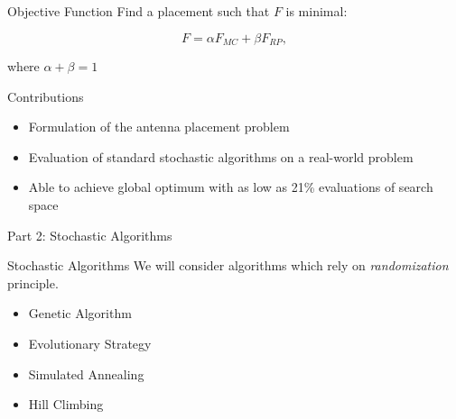 \documentclass{beamer}
\begin{document}
\begin{frame}{Objective Function}
    Find a placement such that $F$ is minimal:
    \begin{tcolorbox}[colback=green!5]
        \begin{equation} \label{eq:optimal}
            F = \alpha F_{MC} + \beta F_{RP},
        \end{equation}
    \end{tcolorbox}
    where $\alpha + \beta = 1$
\end{frame}



\begin{frame}[t]{Contributions}
    \begin{itemize}
        \item Formulation of the antenna placement problem
        \item Evaluation of standard stochastic algorithms on a real-world problem
        \item Able to achieve global optimum with as low as 21\% evaluations of search space
    \end{itemize}
    \vspace{5mm}
\end{frame}


\begin{frame}{\null}
    \begin{tcolorbox}[colback=green!5]
        \centering\Huge
        Part 2: Stochastic Algorithms
    \end{tcolorbox}
\end{frame}
\begin{frame}[t]{Stochastic Algorithms}
    We will consider algorithms which rely on \textit{randomization} principle.
    \vspace{10px}
\begin{itemize} \itemsep1.5em
        \item Genetic Algorithm
        \item Evolutionary Strategy
        \item Simulated Annealing
        \item Hill Climbing
    \end{itemize}
\end{frame}
\end{document}
